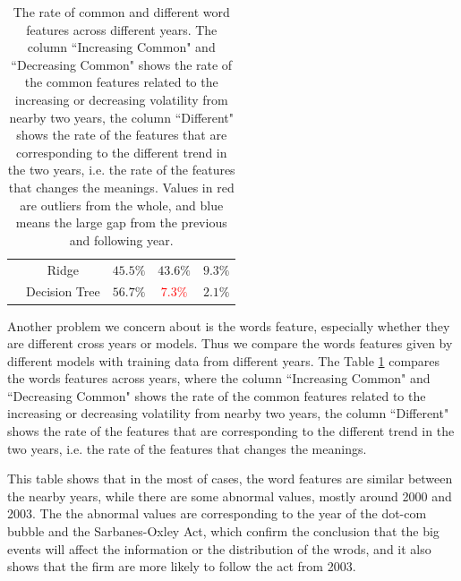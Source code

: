 \documentclass[11pt]{article}
\begin{document}
{\begin{table}[p]
\begin{tabular}{|c|c|c|c|c|}
      \cline{2-5}
                                 & Ridge         & $45.5\%$                   & $43.6\%$                   & $9.3\%$                     \\
      \cline{2-5}
                                 & Decision Tree & $56.7\%$                   & \textcolor{red}{$7.3\%$}   & $2.1\%$                     \\
      \hline
    \end{tabular}
    \caption{The rate of common and different word features across different years. The column ``Increasing Common" and ``Decreasing Common" shows the rate of the common features related to the increasing or decreasing volatility from nearby two years, the column ``Different" shows the rate of the features that are corresponding to the different trend in the two years, i.e. the rate of the features that changes the meanings. Values in red are outliers from the whole, and blue means the large gap from the previous and following year.}
    \label{table-words-feature-year}
  \end{table}
  \clearpage
}

Another problem we concern about is the words feature, especially whether they are different cross years or models. Thus we compare the words features given by different models with training data from different years. The Table \ref{table-words-feature-year} compares the words features across years, where the column ``Increasing Common" and ``Decreasing Common" shows the rate of the common features related to the increasing or decreasing volatility from nearby two years, the column ``Different" shows the rate of the features that are corresponding to the different trend in the two years, i.e. the rate of the features that changes the meanings.

This table shows that in the most of cases, the word features are similar between the nearby years, while there are some abnormal values, mostly around 2000 and 2003. The the abnormal values are corresponding to the year of the dot-com bubble and the Sarbanes-Oxley Act, which confirm the conclusion that the big events will affect the information or the distribution of the wrods, and it also shows that the firm are more likely to follow the act from 2003.
\end{document}
